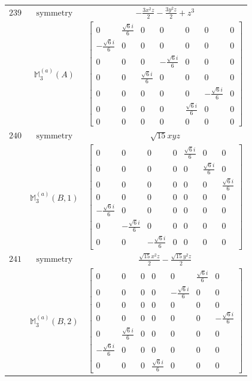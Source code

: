 \documentclass[fleqn,8pt,landscape]{jsarticle}
\begin{document}
\begin{longtable}{ccc}
$ 239 $ & $ \text{symmetry} $ & $ - \frac{3 x^{2} z}{2} - \frac{3 y^{2} z}{2} + z^{3} $ \\
$  $ & $ \mathbb{M}_{3}^{(a)}(A) $ & $ \begin{bmatrix} 0 & \frac{\sqrt{6} i}{6} & 0 & 0 & 0 & 0 & 0 \\ - \frac{\sqrt{6} i}{6} & 0 & 0 & 0 & 0 & 0 & 0 \\ 0 & 0 & 0 & - \frac{\sqrt{6} i}{6} & 0 & 0 & 0 \\ 0 & 0 & \frac{\sqrt{6} i}{6} & 0 & 0 & 0 & 0 \\ 0 & 0 & 0 & 0 & 0 & - \frac{\sqrt{6} i}{6} & 0 \\ 0 & 0 & 0 & 0 & \frac{\sqrt{6} i}{6} & 0 & 0 \\ 0 & 0 & 0 & 0 & 0 & 0 & 0 \end{bmatrix} $ \\ \hline
$ 240 $ & $ \text{symmetry} $ & $ \sqrt{15} x y z $ \\
$  $ & $ \mathbb{M}_{3}^{(a)}(B,1) $ & $ \begin{bmatrix} 0 & 0 & 0 & 0 & \frac{\sqrt{6} i}{6} & 0 & 0 \\ 0 & 0 & 0 & 0 & 0 & \frac{\sqrt{6} i}{6} & 0 \\ 0 & 0 & 0 & 0 & 0 & 0 & \frac{\sqrt{6} i}{6} \\ 0 & 0 & 0 & 0 & 0 & 0 & 0 \\ - \frac{\sqrt{6} i}{6} & 0 & 0 & 0 & 0 & 0 & 0 \\ 0 & - \frac{\sqrt{6} i}{6} & 0 & 0 & 0 & 0 & 0 \\ 0 & 0 & - \frac{\sqrt{6} i}{6} & 0 & 0 & 0 & 0 \end{bmatrix} $ \\ \hline
$ 241 $ & $ \text{symmetry} $ & $ \frac{\sqrt{15} x^{2} z}{2} - \frac{\sqrt{15} y^{2} z}{2} $ \\
$  $ & $ \mathbb{M}_{3}^{(a)}(B,2) $ & $ \begin{bmatrix} 0 & 0 & 0 & 0 & 0 & \frac{\sqrt{6} i}{6} & 0 \\ 0 & 0 & 0 & 0 & - \frac{\sqrt{6} i}{6} & 0 & 0 \\ 0 & 0 & 0 & 0 & 0 & 0 & 0 \\ 0 & 0 & 0 & 0 & 0 & 0 & - \frac{\sqrt{6} i}{6} \\ 0 & \frac{\sqrt{6} i}{6} & 0 & 0 & 0 & 0 & 0 \\ - \frac{\sqrt{6} i}{6} & 0 & 0 & 0 & 0 & 0 & 0 \\ 0 & 0 & 0 & \frac{\sqrt{6} i}{6} & 0 & 0 & 0 \end{bmatrix} $ \\ \hline

\end{longtable}
\end{document}
